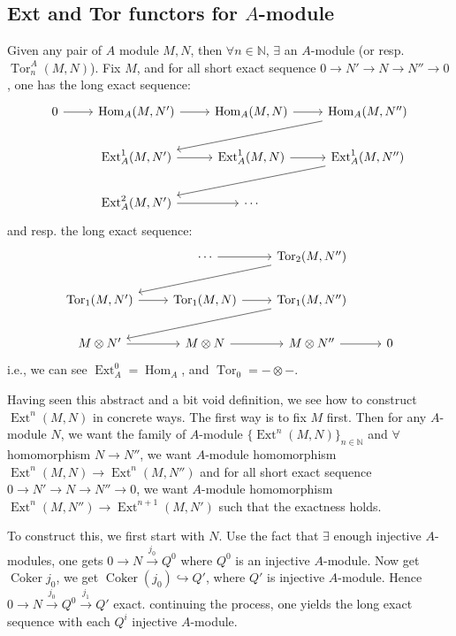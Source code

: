 \documentclass[12pt]{article}
\theoremstyle{definition}
\theoremstyle{plain}
\DeclareMathOperator{\Hom}{Hom}
\DeclareMathOperator{\Coker}{Coker}
\DeclareMathOperator{\Ext}{Ext}
\DeclareMathOperator{\Tor}{Tor}
\newcommand{\nat}{\mathbb{N}}
\newcommand{\inj}{\hookrightarrow}
\begin{document}
\bigskip
\subsection{Ext and Tor functors for $A$-module}
Given any pair of $A$ module $M, N$, then $\forall n\in \nat$, $\exists$ an $A$-module (or resp. $\Tor_n^A(M, N)$). Fix $M$, and for all short exact sequence $0\to N'\to N\to N''\to 0$, one has the long exact sequence:
\begin{equation}
  \begin{tikzcd}
    0\ar{r} &\Hom_A(M, N') \ar{r} & \Hom_A(M, N) \ar{r} &\Hom_A(M, N'')\ar{lld}\\
    &\Ext_A^1(M, N') \ar{r} &\Ext_A^1(M, N) \ar{r} &\Ext_A^1(M, N'')\ar{lld}\\
    &\Ext_A^2(M, N') \ar{r} &\cdots
  \end{tikzcd}
\end{equation}
 and resp. the long exact sequence:
 \begin{equation}
   \begin{tikzcd}
     &\cdots \ar{r} &\Tor_2(M, N'')\ar{lld}\\
     \Tor_1(M, N') \ar{r} &\Tor_1(M, N) \ar{r} &\Tor_1(M, N'')\ar{lld}\\
     M\otimes N'\ar{r} &M\otimes N \ar{r} &M\otimes N''\ar{r} &0
   \end{tikzcd}
 \end{equation}
 i.e., we can see $\Ext_A^0=\Hom_A$, and $\Tor_0=-\otimes-$.

 \medskip
 Having seen this abstract and a bit void definition, we see how to construct $\Ext^n(M, N)$ in concrete ways. The first way is to fix $M$ first. Then for any $A$-module $N$, we want the family of $A$-module $\{\Ext^n(M, N)\}_{n\in \nat}$ and $\forall$ homomorphism $N\to N''$, we want $A$-module homomorphism $\Ext^n(M, N)\to \Ext^n(M, N'')$ and for all short exact sequence $0\to N'\to N\to N''\to 0$, we want $A$-module homomorphism $\Ext^n(M, N'')\to \Ext^{n+1}(M, N')$ such that the exactness holds.

 \medskip
 To construct this, we first start with $N$. Use the fact that $\exists $ enough injective $A$-modules, one gets $0\to N\overset{j_0}{\to} Q^0$ where $Q^0$ is an injective $A$-module. Now get $\Coker j_0$, we get $\Coker(j_0)\inj Q'$, where $Q'$ is injective $A$-module. Hence$0\to N\overset{j_0}{\to} Q^0\overset{j_1}{\to} Q'$ exact. continuing the process, one yields the long exact sequence with each $Q^i$ injective $A$-module.
\end{document}
